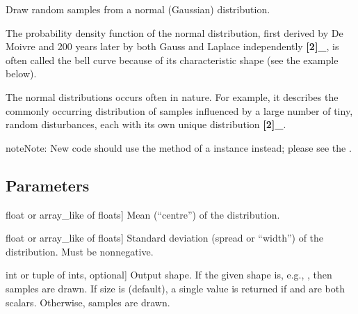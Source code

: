 \documentclass[letterpaper,10pt,english]{sphinxmanual}
\begin{document}
\begin{fulllineitems}
\label{\detokenize{myfpga:myfpga.sim_lut.normal}}
\pysigstartsignatures
{}
\pysigstopsignatures
\sphinxAtStartPar
Draw random samples from a normal (Gaussian) distribution.

\sphinxAtStartPar
The probability density function of the normal distribution, first
derived by De Moivre and 200 years later by both Gauss and Laplace
independently {\color{red}\bfseries{}{[}2{]}\_}, is often called the bell curve because of
its characteristic shape (see the example below).

\sphinxAtStartPar
The normal distributions occurs often in nature.  For example, it
describes the commonly occurring distribution of samples influenced
by a large number of tiny, random disturbances, each with its own
unique distribution {\color{red}\bfseries{}{[}2{]}\_}.

\begin{sphinxadmonition}{note}{Note:}
\sphinxAtStartPar
New code should use the 
method of a  instance instead;
please see the .
\end{sphinxadmonition}


\subsection{Parameters}
\label{\detokenize{myfpga:id15}}\begin{description}
\sphinxlineitem{loc}{[}float or array\_like of floats{]}
\sphinxAtStartPar
Mean (“centre”) of the distribution.

\sphinxlineitem{scale}{[}float or array\_like of floats{]}
\sphinxAtStartPar
Standard deviation (spread or “width”) of the distribution. Must be
non\sphinxhyphen{}negative.

\sphinxlineitem{size}{[}int or tuple of ints, optional{]}
\sphinxAtStartPar
Output shape.  If the given shape is, e.g., , then
 samples are drawn.  If size is  (default),
a single value is returned if  and  are both scalars.
Otherwise,  samples are drawn.


\end{description}
\end{fulllineitems}
\end{document}
